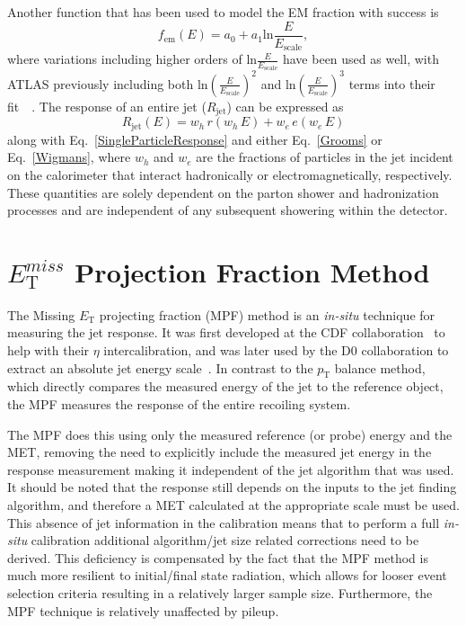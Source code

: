 \noindent 
Another function that has been used to model the EM fraction with success is 
\begin{equation}
  \label{Wigmans}
  f_{\mathrm{em}}\left(E\right)=a_0+a_1\mathrm{ln}\frac{E}{E_{\mathrm{scale}}}, 
\end{equation}
\noindent
where variations including higher orders of $\mathrm{ln}\frac{E}{E_{\mathrm{scale}}}$ have been used as well, with ATLAS previously including both $\mathrm{ln}\left(\frac{E}{E_{\mathrm{scale}}}\right)^2$ and $\mathrm{ln}\left(\frac{E}{E_{\mathrm{scale}}}\right)^3$ terms into their fit~\cite{ATLAS-CONF-2010-056}~\cite{ATLAS-CONF-2011-032}.  
The response of an entire jet ($R_{\mathrm{jet}}$) can be expressed as 
\begin{equation}
  R_{\mathrm{jet}}\left(E\right)=w_h\,r\left(w_h\,E\right)+w_e\,e\left(w_e\,E\right)
\end{equation}
\noindent 
along with Eq.~\ref{SingleParticleResponse} and either Eq.~\ref{Grooms} or Eq.~\ref{Wigmans}, where $w_h$ and  $w_e$ are the fractions of particles in the jet incident on the calorimeter that interact hadronically or electromagnetically, respectively.  
These quantities are solely dependent on the parton shower and hadronization processes and are independent of any subsequent showering within the detector.   

\section{$E_{\mathrm T}^{miss}$ Projection Fraction Method}
\label{METProj}

The Missing $E_{\mathrm T}$ projecting fraction (MPF) method is an \textit{in-situ} technique for measuring the jet response.  
It was first developed at the CDF collaboration~\cite{abe1992dijet} to help with their $\eta$ intercalibration, and was later used by the D0 collaboration to extract an absolute jet energy scale~\cite{item/10150/186444}.  
In contrast to the $p_{\mathrm T}$ balance method, which directly compares the measured energy of the jet to the reference object, the MPF measures the response of the entire recoiling system.

The MPF does this using only the measured reference (or probe) energy and the MET, removing the need to explicitly include the measured jet energy in the response measurement making it independent of the jet algorithm that was used.  
It should be noted that the response still depends on the inputs to the jet finding algorithm, and therefore a MET calculated at the appropriate scale must be used.  
This absence of jet information in the calibration means that to perform a full \textit{in-situ} calibration additional algorithm/jet size related corrections need to be derived.  
This deficiency is compensated by the fact that the MPF method is much more resilient to initial/final state radiation, which allows for looser event selection criteria resulting in a relatively larger sample size.  
Furthermore, the MPF technique is relatively unaffected by pileup.  

